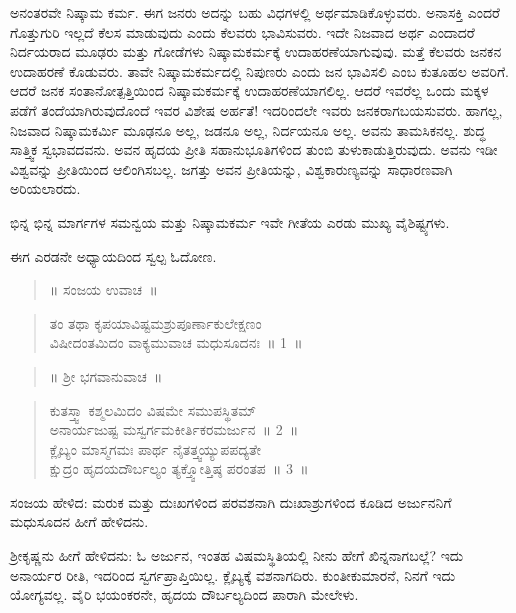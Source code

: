 ಅನಂತರವೇ ನಿಷ್ಕಾಮ ಕರ್ಮ. ಈಗ ಜನರು ಅದನ್ನು ಬಹು ವಿಧಗಳಲ್ಲಿ ಅರ್ಥಮಾಡಿಕೊಳ್ಳುವರು. ಅನಾಸಕ್ತಿ ಎಂದರೆ ಗೊತ್ತುಗುರಿ ಇಲ್ಲದೆ ಕೆಲಸ ಮಾಡುವುದು ಎಂದು ಕೆಲವರು ಭಾವಿಸುವರು. ಇದೇ ನಿಜವಾದ ಅರ್ಥ ಎಂದಾದರೆ ನಿರ್ದಯರಾದ ಮೂಢರು ಮತ್ತು ಗೋಡೆಗಳು ನಿಷ್ಕಾಮಕರ್ಮಕ್ಕೆ ಉದಾಹರಣೆಯಾಗುವುವು. ಮತ್ತೆ ಕೆಲವರು ಜನಕನ ಉದಾಹರಣೆ ಕೊಡುವರು. ತಾವೇ ನಿಷ್ಕಾಮಕರ್ಮದಲ್ಲಿ ನಿಪುಣರು ಎಂದು ಜನ ಭಾವಿಸಲಿ ಎಂಬ ಕುತೂಹಲ ಅವರಿಗೆ. ಆದರೆ ಜನಕ ಸಂತಾನೋತ್ಪತ್ತಿಯಿಂದ ನಿಷ್ಕಾಮಕರ್ಮಕ್ಕೆ ಉದಾಹರಣೆಯಾಗಲಿಲ್ಲ. ಆದರೆ ಇವರೆಲ್ಲ ಒಂದು ಮಕ್ಕಳ ಪಡೆಗೆ ತಂದೆಯಾಗಿರುವುದೊಂದೆ ಇವರ ವಿಶೇಷ ಅರ್ಹತೆ! ಇದರಿಂದಲೇ ಇವರು ಜನಕರಾಗಬಯಸುವರು. ಹಾಗಲ್ಲ, ನಿಜವಾದ ನಿಷ್ಕಾಮಕರ್ಮಿ ಮೂಢನೂ ಅಲ್ಲ, ಜಡನೂ ಅಲ್ಲ, ನಿರ್ದಯನೂ ಅಲ್ಲ. ಅವನು ತಾಮಸಿಕನಲ್ಲ. ಶುದ್ಧ ಸಾತ್ತ್ವಿಕ ಸ್ವಭಾವದವನು. ಅವನ ಹೃದಯ ಪ್ರೀತಿ ಸಹಾನುಭೂತಿಗಳಿಂದ ತುಂಬಿ ತುಳುಕಾಡುತ್ತಿರುವುದು. ಅವನು ಇಡೀ ವಿಶ್ವವನ್ನು ಪ್ರೀತಿಯಿಂದ ಆಲಿಂಗಿಸಬಲ್ಲ. ಜಗತ್ತು ಅವನ ಪ್ರೀತಿಯನ್ನು, ವಿಶ್ವಕಾರುಣ್ಯವನ್ನು ಸಾಧಾರಣವಾಗಿ ಅರಿಯಲಾರದು.

ಭಿನ್ನ ಭಿನ್ನ ಮಾರ್ಗಗಳ ಸಮನ್ವಯ ಮತ್ತು ನಿಷ್ಕಾಮಕರ್ಮ ಇವೇ ಗೀತೆಯ ಎರಡು ಮುಖ್ಯ ವೈಶಿಷ್ಟ್ಯಗಳು.

ಈಗ ಎರಡನೇ ಅಧ್ಯಾಯದಿಂದ ಸ್ವಲ್ಪ ಓದೋಣ.

\begin{verse}
॥ ಸಂಜಯ ಉವಾಚ~॥
\end{verse}

\begin{verse}
 ತಂ ತಥಾ ಕೃಪಯಾವಿಷ್ಟಮಶ್ರುಪೂರ್ಣಾಕುಲೇಕ್ಷಣಂ\\
 ವಿಷೀದಂತಮಿದಂ ವಾಕ್ಯಮುವಾಚ ಮಧುಸೂದನಃ~॥ 1~॥
\end{verse}

\begin{verse}
॥ ಶ‍್ರೀ ಭಗವಾನುವಾಚ~॥
\end{verse}

\begin{verse}
 ಕುತಸ್ತ್ವಾ ಕಶ್ಮಲಮಿದಂ ವಿಷಮೇ ಸಮುಪಸ್ಥಿತಮ್​\\
 ಅನಾರ್ಯಜುಷ್ಟ ಮಸ್ವರ್ಗಮಕೀರ್ತಿಕರಮರ್ಜುನ~॥ 2~॥\\
 ಕ್ಲೈಬ್ಯಂ ಮಾಸ್ಮಗಮಃ ಪಾರ್ಥ ನೈತತ್ತ್ವಯ್ಯುಪಪದ್ಯತೇ\\
 ಕ್ಷುದ್ರಂ ಹೃದಯದೌರ್ಬಲ್ಯಂ ತ್ಯಕ್ತ್ವೋತ್ತಿಷ್ಠ ಪರಂತಪ~॥ 3~॥
\end{verse}

\vskip 0.3cm

ಸಂಜಯ ಹೇಳಿದ: ಮರುಕ ಮತ್ತು ದುಃಖಗಳಿಂದ ಪರವಶನಾಗಿ ದುಃಖಾಶ್ರುಗಳಿಂದ ಕೂಡಿದ ಅರ್ಜುನನಿಗೆ ಮಧುಸೂದನ ಹೀಗೆ ಹೇಳಿದನು.

\vskip 0.3cm

ಶ‍್ರೀಕೃಷ್ಣನು ಹೀಗೆ ಹೇಳಿದನು: ಓ ಅರ್ಜುನ, ಇಂತಹ ವಿಷಮಸ್ಥಿತಿಯಲ್ಲಿ ನೀನು ಹೇಗೆ ಖಿನ್ನನಾಗಬಲ್ಲೆ? ಇದು ಅನಾರ್ಯರ ರೀತಿ, ಇದರಿಂದ ಸ್ವರ್ಗಪ್ರಾಪ್ತಿಯಿಲ್ಲ. ಕ್ಲೈಬ್ಯಕ್ಕೆ ವಶನಾಗದಿರು. ಕುಂತೀಕುಮಾರನೆ, ನಿನಗೆ ಇದು ಯೋಗ್ಯವಲ್ಲ. ವೈರಿ ಭಯಂಕರನೇ, ಹೃದಯ ದೌರ್ಬಲ್ಯದಿಂದ ಪಾರಾಗಿ ಮೇಲೇಳು.

\vskip 0.3cm


